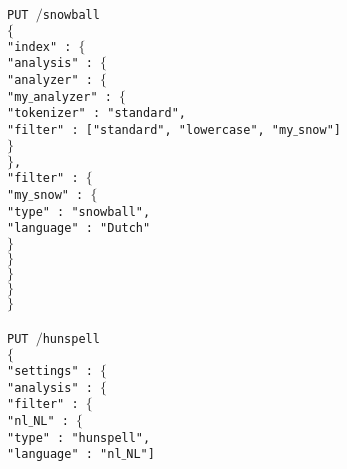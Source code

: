 \noindent\texttt{PUT $/$snowball} \\
\texttt{$\{$}\\
\indent   \texttt{"index" : $\{$}\\
\indent \indent       \texttt{"analysis" : $\{$}\\
\indent \indent \indent            \texttt{"analyzer" : $\{$}\\
\indent \indent \indent \indent              \texttt{"my$\_$analyzer" : $\{$}\\
\indent \indent \indent \indent \indent                    \texttt{"tokenizer" : "standard",}\\
\indent \indent \indent \indent \indent                   \texttt{"filter" : ["standard", "lowercase",     "my$\_$snow"]}\\
\indent \indent \indent \indent                \texttt{$\}$}\\
\indent \indent \indent            \texttt{$\}$,}\\
\indent \indent \indent           \texttt{"filter" : $\{$}\\
\indent \indent \indent \indent                 \texttt{"my$\_$snow" : $\{$}\\
\indent \indent \indent \indent \indent                    \texttt{"type" : "snowball",}\\
\indent \indent \indent \indent \indent                     \texttt{"language" : "Dutch"}\\
\indent \indent \indent \indent             \texttt{$\}$}\\
\indent \indent \indent           \texttt{$\}$}\\
\indent \indent       \texttt{$\}$}\\
\indent   \texttt{$\}$}\\
\texttt{$\}$}\\
\\
\noindent\texttt{PUT $/$hunspell} \\
\texttt{$\{$}\\
\indent   \texttt{"settings" : $\{$}\\
\indent \indent       \texttt{"analysis" : $\{$}\\
\indent \indent \indent            \texttt{"filter" : $\{$}\\
\indent \indent \indent \indent              \texttt{"nl$\_$NL" : $\{$}\\
\indent \indent \indent \indent \indent                    \texttt{"type" : "hunspell",}\\
\indent \indent \indent \indent \indent                   \texttt{"language" : "nl$\_$NL"]}\\
